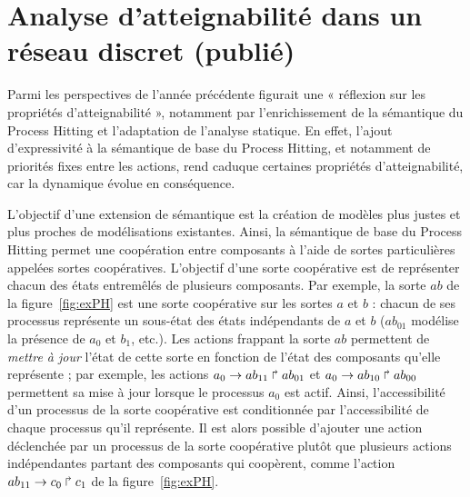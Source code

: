 \section{Analyse d'atteignabilité dans un réseau discret \normalsize(publié)}
\label{sec:cs2bio}

Parmi les perspectives de l'année précédente figurait une « réflexion sur les propriétés d'atteignabilité », notamment par l'enrichissement de la sémantique du Process Hitting et l'adaptation de l'analyse statique.
En effet, l'ajout d'expressivité à la sémantique de base du Process Hitting, et notamment de priorités fixes entre les actions, rend caduque certaines propriétés d'atteignabilité, car la dynamique évolue en conséquence.

L'objectif d'une extension de sémantique est la création de modèles plus justes et plus proches de modélisations existantes.
Ainsi, la sémantique de base du Process Hitting permet une coopération entre composants à l'aide de sortes particulières appelées sortes coopératives.
L'objectif d'une sorte coopérative est de représenter chacun des états entremêlés de plusieurs composants.
Par exemple, la sorte $ab$ de la figure~\ref{fig:exPH} est une sorte coopérative sur les sortes $a$ et $b$ : chacun de ses processus représente un sous-état des états indépendants de $a$ et $b$ ($ab_{01}$ modélise la présence de $a_0$ et $b_1$, etc.).
Les actions frappant la sorte $ab$ permettent de \emph{mettre à jour} l'état de cette sorte en fonction de l'état des composants qu'elle représente ;
par exemple, les actions $a_0\rightarrow ab_{11}\Rsh ab_{01}$ et $a_0\rightarrow ab_{10}\Rsh ab_{00}$ permettent sa mise à jour lorsque le processus $a_0$ est actif.
Ainsi, l'accessibilité d'un processus de la sorte coopérative est conditionnée par l'accessibilité de chaque processus qu'il représente.
Il est alors possible d'ajouter une action déclenchée par un processus de la sorte coopérative plutôt que plusieurs actions indépendantes partant des composants qui coopèrent, comme l'action $ab_{11}\rightarrow c_0\Rsh c_1$ de la figure~\ref{fig:exPH}.

